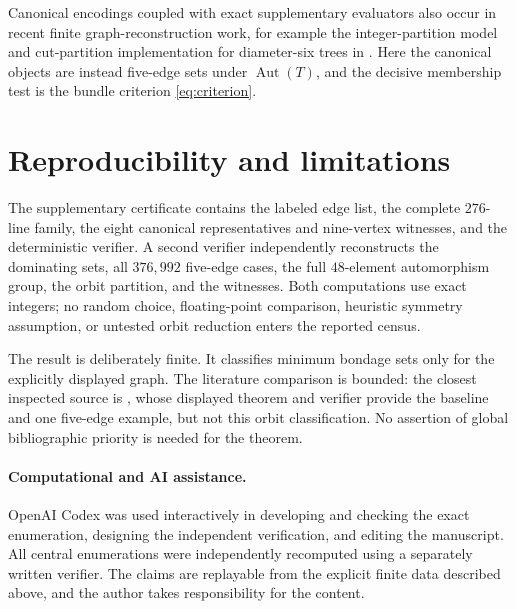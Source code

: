 \documentclass[11pt]{article}
\newcommand{\Aut}{\operatorname{Aut}}
\begin{document}
Canonical encodings coupled with exact supplementary evaluators also
occur in recent finite graph-reconstruction work, for example the
integer-partition model and cut-partition implementation for
diameter-six trees in \cite{Zeng2026MultiplicityArxiv}.  Here the
canonical objects are instead five-edge sets under $\Aut(T)$, and the
decisive membership test is the bundle criterion \eqref{eq:criterion}.

\section{Reproducibility and limitations}

The supplementary certificate contains the labeled edge list, the
complete $276$-line family, the eight canonical representatives and
nine-vertex witnesses, and the deterministic verifier.  A second
verifier independently reconstructs the dominating sets, all
$376{,}992$ five-edge cases, the full $48$-element automorphism group,
the orbit partition, and the witnesses.  Both computations use exact
integers; no random choice, floating-point comparison, heuristic
symmetry assumption, or untested orbit reduction enters the reported
census.

The result is deliberately finite.  It classifies minimum bondage sets
only for the explicitly displayed graph.  The literature comparison is
bounded: the closest inspected source is \cite{Srivastava2026Truncated},
whose displayed theorem and verifier provide the baseline and one
five-edge example, but not this orbit classification.  No assertion of
global bibliographic priority is needed for the theorem.

\paragraph{Computational and AI assistance.}
OpenAI Codex was used interactively in developing and checking the exact
enumeration, designing the independent verification, and editing the
manuscript.  All central enumerations were independently recomputed
using a separately written verifier.  The claims are replayable from
the explicit finite data described above, and the author takes
responsibility for the content.



\end{document}
